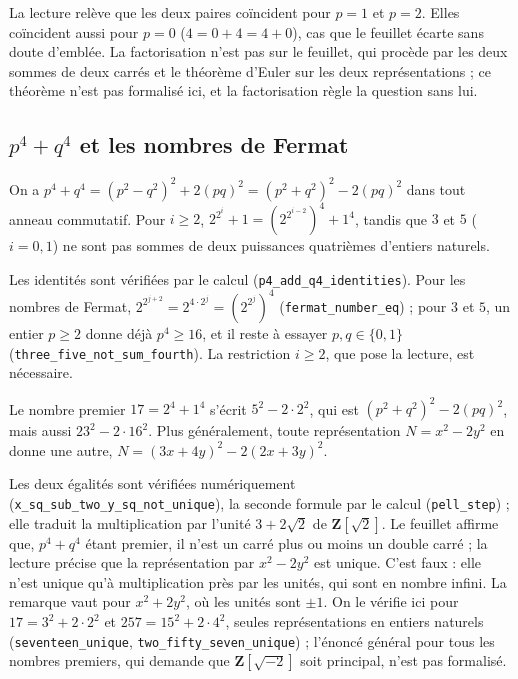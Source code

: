 \begin{remarque}
La lecture relève que les deux paires coïncident pour $p = 1$ et $p = 2$. Elles coïncident aussi pour $p = 0$ ($4 = 0 + 4 = 4 + 0$), cas que le feuillet écarte sans doute d'emblée. La factorisation n'est pas sur le feuillet, qui procède par les deux sommes de deux carrés et le théorème d'Euler sur les deux représentations ; ce théorème n'est pas formalisé ici, et la factorisation règle la question sans lui.
\end{remarque}

\subsection*{$p^4 + q^4$ et les nombres de Fermat}

\begin{enonce}
On a $p^4 + q^4 = (p^2 - q^2)^2 + 2(pq)^2 = (p^2 + q^2)^2 - 2(pq)^2$ dans tout anneau commutatif. Pour $i \geq 2$, $2^{2^i} + 1 = (2^{2^{i-2}})^4 + 1^4$, tandis que $3$ et $5$ ($i = 0, 1$) ne sont pas sommes de deux puissances quatrièmes d'entiers naturels.
\end{enonce}

Les identités sont vérifiées par le calcul (\texttt{p4\_add\_q4\_identities}). Pour les nombres de Fermat, $2^{2^{j+2}} = 2^{4 \cdot 2^j} = (2^{2^j})^4$ (\texttt{fermat\_number\_eq}) ; pour $3$ et $5$, un entier $p \geq 2$ donne déjà $p^4 \geq 16$, et il reste à essayer $p, q \in \{0, 1\}$ (\texttt{three\_five\_not\_sum\_fourth}). La restriction $i \geq 2$, que pose la lecture, est nécessaire.

\begin{contrexemple}
Le nombre premier $17 = 2^4 + 1^4$ s'écrit $5^2 - 2 \cdot 2^2$, qui est $(p^2 + q^2)^2 - 2(pq)^2$, mais aussi $23^2 - 2 \cdot 16^2$. Plus généralement, toute représentation $N = x^2 - 2y^2$ en donne une autre, $N = (3x + 4y)^2 - 2(2x + 3y)^2$.
\end{contrexemple}

Les deux égalités sont vérifiées numériquement (\texttt{x\_sq\_sub\_two\_y\_sq\_not\_unique}), la seconde formule par le calcul (\texttt{pell\_step}) ; elle traduit la multiplication par l'unité $3 + 2\sqrt 2$ de $\mathbf Z[\sqrt 2]$. Le feuillet affirme que, $p^4 + q^4$ étant premier, il n'est  un carré plus ou moins un double carré ; la lecture précise que la représentation par $x^2 - 2y^2$ est unique. C'est faux : elle n'est unique qu'à multiplication près par les unités, qui sont en nombre infini. La remarque vaut pour $x^2 + 2y^2$, où les unités sont $\pm 1$. On le vérifie ici pour $17 = 3^2 + 2 \cdot 2^2$ et $257 = 15^2 + 2 \cdot 4^2$, seules représentations en entiers naturels (\texttt{seventeen\_unique}, \texttt{two\_fifty\_seven\_unique}) ; l'énoncé général pour tous les nombres premiers, qui demande que $\mathbf Z[\sqrt{-2}]$ soit principal, n'est pas formalisé.

